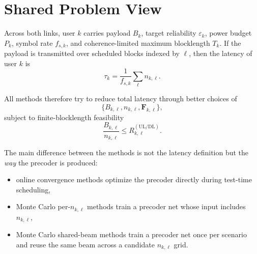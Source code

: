 \documentclass[11pt]{article}
\newcommand{\UL}{\mathrm{UL}}
\newcommand{\DL}{\mathrm{DL}}
\newcommand{\F}{\mathbf{F}}
\begin{document}
\section{Shared Problem View}
Across both links, user \(k\) carries payload \(B_k\), target reliability \(\varepsilon_k\), power budget \(P_k\), symbol rate \(f_{s,k}\), and coherence-limited maximum blocklength \(T_k\). If the payload is transmitted over scheduled blocks indexed by \(\ell\), then the latency of user \(k\) is
\begin{equation}
\tau_k = \frac{1}{f_{s,k}} \sum_{\ell} n_{k,\ell}.
\end{equation}

All methods therefore try to reduce total latency through better choices of
\begin{equation}
\{B_{k,\ell}, n_{k,\ell}, \F_{k,\ell}\},
\end{equation}
subject to finite-blocklength feasibility
\begin{equation}
\frac{B_{k,\ell}}{n_{k,\ell}} \le R_{k,\ell}^{(\UL/\DL)}.
\end{equation}

The main difference between the methods is not the latency definition but the \emph{way} the precoder is produced:
\begin{itemize}[leftmargin=1.5em]
    \item online convergence methods optimize the precoder directly during test-time scheduling,
    \item Monte Carlo per-\(n_{k,\ell}\) methods train a precoder net whose input includes \(n_{k,\ell}\),
    \item Monte Carlo shared-beam methods train a precoder net once per scenario and reuse the same beam across a candidate \(n_{k,\ell}\) grid.
\end{itemize}
\end{document}
